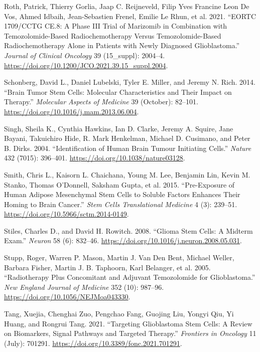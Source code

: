 \documentclass[
  default,
]{sn-jnl}
\newlength{\cslhangindent}
\newenvironment{CSLReferences}[2] %
 {\begin{list}{}{%
  \setlength{\itemindent}{0pt}
  \setlength{\leftmargin}{0pt}
  \setlength{\parsep}{0pt}
  \ifodd #1
   \setlength{\leftmargin}{\cslhangindent}
   \setlength{\itemindent}{-1\cslhangindent}
  \fi
  \setlength{\itemsep}{#2\baselineskip}}}
 {\end{list}}
\begin{document}
\begin{CSLReferences}{1}{0}
Roth, Patrick, Thierry Gorlia, Jaap C. Reijneveld, Filip Yves Francine
Leon De Vos, Ahmed Idbaih, Jean-Sebastien Frenel, Emilie Le Rhun, et al.
2021. {``EORTC 1709/CCTG CE.8: A Phase III Trial of Marizomib in
Combination with Temozolomide-Based Radiochemotherapy Versus
Temozolomide-Based Radiochemotherapy Alone in Patients with Newly
Diagnosed Glioblastoma.''} \emph{Journal of Clinical Oncology} 39
(15{\_}suppl): 2004--4.
\url{https://doi.org/10.1200/JCO.2021.39.15_suppl.2004}.

Schonberg, David L., Daniel Lubelski, Tyler E. Miller, and Jeremy N.
Rich. 2014. {``Brain Tumor Stem Cells: Molecular Characteristics and
Their Impact on Therapy.''} \emph{Molecular Aspects of Medicine} 39
(October): 82--101. \url{https://doi.org/10.1016/j.mam.2013.06.004}.

Singh, Sheila K., Cynthia Hawkins, Ian D. Clarke, Jeremy A. Squire, Jane
Bayani, Takuichiro Hide, R. Mark Henkelman, Michael D. Cusimano, and
Peter B. Dirks. 2004. {``Identification of Human Brain Tumour Initiating
Cells.''} \emph{Nature} 432 (7015): 396--401.
\url{https://doi.org/10.1038/nature03128}.

Smith, Chris L., Kaisorn L. Chaichana, Young M. Lee, Benjamin Lin, Kevin
M. Stanko, Thomas O'Donnell, Saksham Gupta, et al. 2015. {``Pre-Exposure
of Human Adipose Mesenchymal Stem Cells to Soluble Factors Enhances
Their Homing to Brain Cancer.''} \emph{Stem Cells Translational
Medicine} 4 (3): 239--51. \url{https://doi.org/10.5966/sctm.2014-0149}.

Stiles, Charles D., and David H. Rowitch. 2008. {``Glioma Stem Cells: A
Midterm Exam.''} \emph{Neuron} 58 (6): 832--46.
\url{https://doi.org/10.1016/j.neuron.2008.05.031}.

Stupp, Roger, Warren P. Mason, Martin J. Van Den Bent, Michael Weller,
Barbara Fisher, Martin J. B. Taphoorn, Karl Belanger, et al. 2005.
{``Radiotherapy Plus Concomitant and Adjuvant Temozolomide for
Glioblastoma.''} \emph{New England Journal of Medicine} 352 (10):
987--96. \url{https://doi.org/10.1056/NEJMoa043330}.

Tang, Xuejia, Chenghai Zuo, Pengchao Fang, Guojing Liu, Yongyi Qiu, Yi
Huang, and Rongrui Tang. 2021. {``Targeting Glioblastoma Stem Cells: A
Review on Biomarkers, Signal Pathways and Targeted Therapy.''}
\emph{Frontiers in Oncology} 11 (July): 701291.
\url{https://doi.org/10.3389/fonc.2021.701291}.


\end{CSLReferences}
\end{document}
